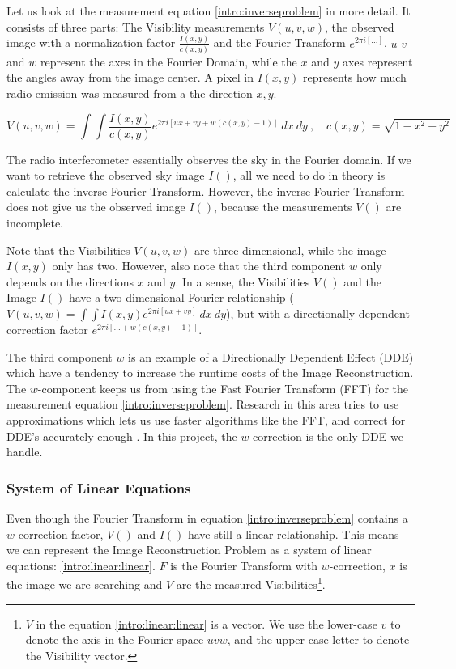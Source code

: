 Let us look at the measurement equation \eqref{intro:inverseproblem} in more detail. It consists of three parts: The Visibility measurements $V(u,v,w)$, the observed image with a normalization factor $\frac{I(x, y)}{c(x, y)}$ and the Fourier Transform $e^{2 \pi i [\ldots]}$. $u$ $v$ and $w$ represent the axes in the Fourier Domain, while the $x$ and $y$ axes represent the angles away from the image center. A pixel in $I(x,y)$ represents how much radio emission was measured from a the direction $x,y$.

\begin{equation}\label{intro:inverseproblem}
V(u, v, w) = \int\int  \frac{I(x, y)}{c(x, y)}  e^{2 \pi i [ux+vy+ w(c(x, y) - 1)]} \: dx \: dy \:,  \quad c(x,y) = \sqrt{1 - x^2 - y ^2}
\end{equation}

The radio interferometer essentially observes the sky in the Fourier domain. If we want to retrieve the observed sky image $I()$, all we need to do in theory is calculate the inverse Fourier Transform. However, the inverse Fourier Transform does not give us the observed image $I()$, because the measurements $V()$ are incomplete.

Note that the Visibilities $V(u,v,w)$ are three dimensional, while the image $I(x,y)$ only has two. However, also note that the third component $w$ only depends on the directions $x$ and $y$. In a sense, the Visibilities $V()$ and the Image $I()$ have a two dimensional Fourier relationship ($V(u,v,w) = \int\int I(x,y) e^{2 \pi i [ux+vy]} \: dx \: dy$), but with a directionally dependent correction factor $e^{2 \pi i [\ldots +w(c(x, y) - 1)]}$. 

The third component $w$ is an example of a Directionally Dependent Effect (DDE) which have a tendency to increase the runtime costs of the Image Reconstruction. The $w$-component keeps us from using the Fast Fourier Transform (FFT) for the measurement equation \eqref{intro:inverseproblem}. Research in this area tries to use approximations which lets us use faster algorithms like the FFT, and correct for DDE's accurately enough \cite{veenboer2017image, offringa2014wsclean, pratley2018fast}. In this project, the $w$-correction is the only DDE we handle.

\subsubsection{System of Linear Equations}\label{intro:linear}
Even though the Fourier Transform in equation \eqref{intro:inverseproblem} contains a $w$-correction factor, $V()$ and $I()$ have still a linear relationship. This means we can represent the Image Reconstruction Problem as a system of linear equations: \eqref{intro:linear:linear}. $F$ is the Fourier Transform with $w$-correction, $x$ is the image we are searching and $V$ are the measured Visibilities\footnote{$V$ in the equation \eqref{intro:linear:linear} is a vector. We use the lower-case $v$ to denote the axis in the Fourier space $uvw$, and the upper-case letter to denote the Visibility vector.}.

